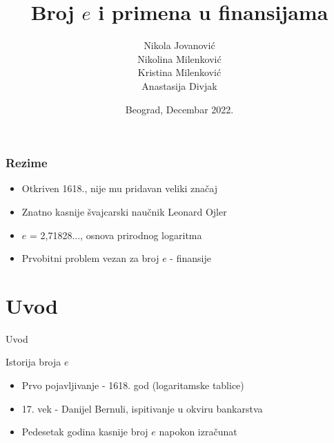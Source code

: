 \documentclass[xcolor=dvipsnames]{beamer}
\title{Broj $e$ i primena u finansijama}
\author[Jovanović, Milenković, Milenković, Divjak]{Nikola Jovanović \\ Nikolina Milenković \\  Kristina Milenković \\ Anastasija Divjak}
\institute{Univerzitet u Beogradu, Matematički fakultet}
\date{Beograd, Decembar 2022.}
\begin{document}
\begin{frame}
  \titlepage
\end{frame}

\begin{frame}
\frametitle{Rezime}
\begin{itemize}
 \item Otkriven 1618., nije mu pridavan veliki značaj
 \item Znatno kasnije švajcarski naučnik Leonard Ojler
 \item $e$ = 2,71828..., osnova prirodnog logaritma
 \item Prvobitni problem vezan za broj $e$ - finansije
\end{itemize}
\end{frame}

\section{Uvod}
\begin{frame}{Uvod}
\begin{block}{Istorija broja $e$}
    \begin{itemize}
        \item Prvo pojavljivanje - 1618. god (logaritamske tablice)
        \item 17. vek - Danijel Bernuli, ispitivanje u okviru bankarstva
        \item Pedesetak godina kasnije broj $e$ napokon izračunat
    \end{itemize}
\end{block}
\end{frame}
\end{document}
